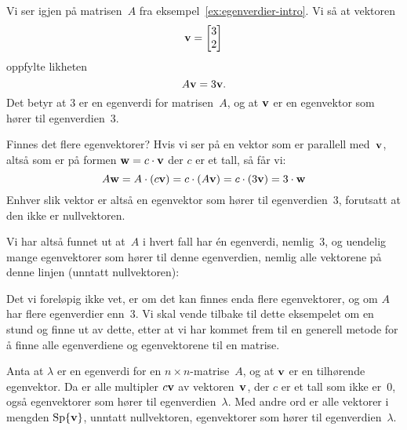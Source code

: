\begin{ex}
Vi ser igjen på matrisen~$A$ fra eksempel~\ref{ex:egenverdier-intro}.
Vi så at vektoren
\[
\mathbf{v} = \begin{bmatrix} 3 \\ 2 \end{bmatrix}
\]
oppfylte likheten
\[
A \mathbf{v} = 3 \mathbf{v}.
\]
Det betyr at $3$ er en egenverdi for matrisen~$A$, og at $\mathbf{v}$ er en
egenvektor som hører til egenverdien~$3$.

Finnes det flere egenvektorer?  Hvis vi ser på en vektor som er
parallell med~$\mathbf{v}$, altså som er på formen $\mathbf{w} = c \cdot \mathbf{v}$
der $c$ er et tall, så får vi:
\[
A \mathbf{w}
= A \cdot (c \mathbf{v})
= c \cdot (A \mathbf{v})
= c \cdot (3 \mathbf{v})
= 3 \cdot \mathbf{w}
\]
Enhver slik vektor er altså en egenvektor som hører til
egenverdien~$3$, forutsatt at den ikke er nullvektoren.

Vi har altså funnet ut at~$A$ i hvert fall har én egenverdi,
nemlig~$3$, og uendelig mange egenvektorer som hører til denne
egenverdien, nemlig alle vektorene på denne linjen (unntatt
nullvektoren):
\begin{center}
\end{center}

Det vi foreløpig ikke vet, er om det kan finnes enda flere
egenvektorer, og om $A$ har flere egenverdier enn~$3$.  Vi skal vende
tilbake til dette eksempelet om en stund og finne ut av dette, etter
at vi har kommet frem til en generell metode for å finne alle
egenverdiene og egenvektorene til en matrise.
\end{ex}


\begin{thm}
\label{thm:egenvektor-sp}
Anta at $\lambda$ er en egenverdi for en $n \times n$-matrise~$A$, og
at $\mathbf{v}$ er en tilhørende egenvektor.  Da er alle multipler
$c \mathbf{v}$ av vektoren~$\mathbf{v}$, der $c$ er et tall som ikke er~$0$,
også egenvektorer som hører til egenverdien~$\lambda$.  Med andre ord
er alle vektorer i mengden $\operatorname{Sp} \{\mathbf{v}\}$, unntatt nullvektoren,
egenvektorer som hører til egenverdien~$\lambda$.
\end{thm}


